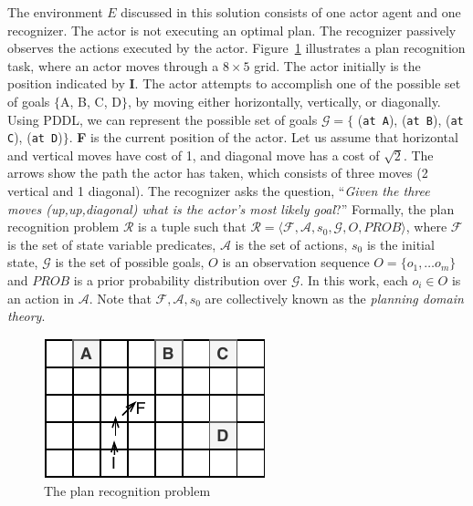 The environment $E$ discussed in this solution consists of one actor agent and one recognizer. The actor is not executing an optimal plan. The recognizer passively observes the actions executed by the actor. Figure~\ref{fig:prp} illustrates a plan recognition task, where an actor moves through a $8\times5$ grid. The actor initially is the position indicated by \textbf{I}. The actor attempts to accomplish one of the possible set of goals $\lbrace$A, B, C, D$\rbrace$, by moving either horizontally, vertically, or diagonally. Using PDDL, we can represent the possible set of goals $\mathcal{G}=\lbrace$ (\texttt{at A}), (\texttt{at B}), (\texttt{at C}), (\texttt{at D})$\rbrace$. \textbf{F} is the current position of the actor. Let us assume that horizontal and vertical moves have cost of 1, and diagonal move has a cost of $\sqrt{2}$. The arrows show the path the actor has taken, which consists of three moves (2 vertical and 1 diagonal). The recognizer asks the question, ``\textit{Given the three moves (up,up,diagonal) what is the actor's most likely goal}?'' Formally, the plan recognition problem $\mathcal{R}$ is a tuple such that $\mathcal{R}=\langle \mathcal{F}, \mathcal{A}, s_0, \mathcal{G}, O, PROB\rangle$, where $\mathcal{F}$ is the set of state variable predicates, $\mathcal{A}$ is the set of actions, $s_0$ is the initial state, $\mathcal{G}$ is the set of possible goals, $O$ is an observation sequence $O=\lbrace o_1,\ldots o_m\rbrace$ and $PROB$ is a prior probability distribution over $\mathcal{G}$. In this work, each $o_i\in O$ is an action in $\mathcal{A}$.
Note that $\mathcal{F}, \mathcal{A}, s_0$ are collectively known as the \textit{planning domain theory}.

\begin{figure}[!ht]
  \centering
\includegraphics[width=0.5\columnwidth]{img/rg.pdf}
  \caption{The plan recognition problem}
  \label{fig:prp}
\end{figure}

